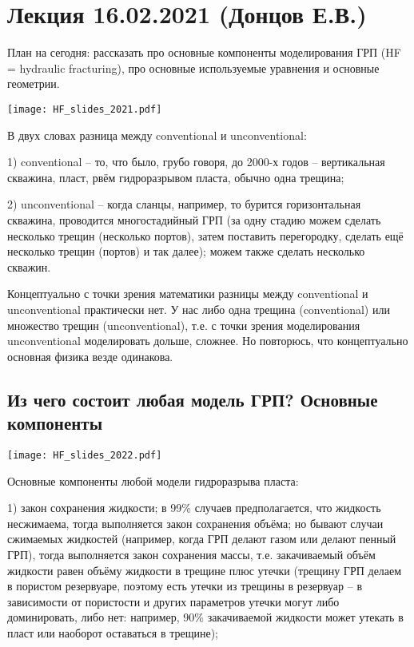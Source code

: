 \documentclass[main.tex]{subfiles}
\begin{document}

\section{Лекция 16.02.2021 (Донцов Е.В.)}

План на сегодня: рассказать про основные компоненты моделирования ГРП (HF = hydraulic fracturing), про основные используемые уравнения и основные геометрии.

\texttt{[image: HF\_slides\_2021.pdf]}

В двух словах разница между conventional и unconventional:

1) conventional -- то, что было, грубо говоря, до 2000-х годов -- вертикальная скважина, пласт, рвём гидроразрывом пласта, обычно одна трещина;

2) unconventional -- когда сланцы, например, то бурится горизонтальная скважина, проводится многостадийный ГРП (за одну стадию можем сделать несколько трещин (несколько портов), затем поставить перегородку, сделать ещё несколько трещин (портов) и так далее); можем также сделать несколько скважин.

Концептуально с точки зрения математики разницы между conventional и unconventional практически нет.
У нас либо одна трещина (conventional) или множество трещин (unconventional), т.е. с точки зрения моделирования unconventional моделировать дольше, сложнее.
Но повторюсь, что концептуально основная физика везде одинакова.

\subsection{Из чего состоит любая модель ГРП? Основные компоненты}

\texttt{[image: HF\_slides\_2022.pdf]}

Основные компоненты любой модели гидроразрыва пласта:

1) закон сохранения жидкости; в 99\% случаев предполагается, что жидкость несжимаема, тогда выполняется закон сохранения объёма; но бывают случаи сжимаемых жидкостей (например, когда ГРП делают газом или делают пенный ГРП), тогда выполняется закон сохранения массы, т.е. закачиваемый объём жидкости равен объёму жидкости в трещине плюс утечки (трещину ГРП делаем в пористом резервуаре, поэтому есть утечки из трещины в резервуар -- в зависимости от пористости и других параметров утечки могут либо доминировать, либо нет: например, 90\% закачиваемой жидкости может утекать в пласт или наоборот оставаться в трещине);
\end{document}
